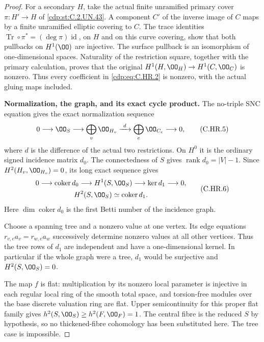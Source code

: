 \begin{proof}
For a secondary $H$, take the actual finite unramified primary
cover $\pi:H'\to H$ of \ref{cdp:st:C.2.UN.43}. A component $C'$ of the inverse
image of $C$ maps by a finite unramified elliptic covering to $C$.
The trace identities
$\operatorname{Tr}\circ\pi^*=(\deg\pi)\operatorname{id}$, on $H$
and on this curve covering, show that both pullbacks on $H^1(\OO)$
are injective. The surface pullback is an isomorphism of
one-dimensional spaces. Naturality of the restriction square,
together with the primary calculation, proves that the original
$H^1(H,\OO_H)\to H^1(C,\OO_C)$ is nonzero. Thus every coefficient
in \eqref{cdp:eq:C.HR.2} is nonzero, with the actual gluing maps included.

\par\medskip\noindent\textbf{Normalization, the graph, and its exact cycle product.}
The no-triple SNC equation gives the exact normalization sequence
\[
 0\longrightarrow\OO_S
 \longrightarrow\bigoplus_v\OO_{H_v}
 \xrightarrow{\ d\ }\bigoplus_e\OO_{C_e}
 \longrightarrow0,                                    \tag{C.HR.5}\label{cdp:eq:C.HR.5}
\]
where $d$ is the difference of the actual two restrictions. On
$H^0$ it is the ordinary signed incidence matrix $d_0$. The
connectedness of $S$ gives $\operatorname{rank}d_0=|V|-1$.
Since $H^2(H_v,\OO_{H_v})=0$, its long exact sequence gives
\[
 \begin{gathered}
 0\longrightarrow\operatorname{coker}d_0
 \longrightarrow H^1(S,\OO_S)
 \longrightarrow\ker d_1\longrightarrow0,\\
             H^2(S,\OO_S)\simeq\operatorname{coker}d_1.
 \end{gathered}                                        \tag{C.HR.6}\label{cdp:eq:C.HR.6}
\]
Here $\dim\operatorname{coker}d_0$ is the first Betti number of
the incidence graph.

Choose a spanning tree and a nonzero value at one vertex.
Its edge equations $r_{v,e}a_v=r_{w,e}a_w$ successively determine
nonzero values at all other vertices. Thus the tree rows of $d_1$
are independent and have a one-dimensional kernel. In particular
if the whole graph were a tree, $d_1$ would be surjective and
$H^2(S,\OO_S)=0$.

The map $f$ is flat: multiplication by its nonzero local parameter
is injective in each regular local ring of the smooth total space,
and torsion-free modules over the base discrete valuation ring
are flat. Upper semicontinuity for this proper flat family gives
$h^2(S,\OO_S)\ge h^2(F,\OO_F)=1$. The central fibre is the
reduced $S$ by hypothesis, so no thickened-fibre cohomology has
been substituted here. The tree case is impossible.


\end{proof}
